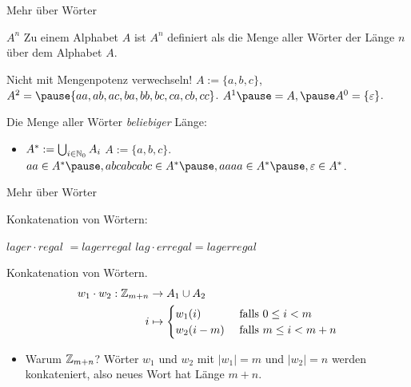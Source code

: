 \begin{frame}{Mehr über Wörter}

	\pause
	
	\begin{block}{$A^n$}
		Zu einem Alphabet $A$ \pause ist $A^n$ definiert als die Menge aller Wörter \pause der Länge $n$ \pause über dem Alphabet $A$.
	\end{block}

	\begin{itemize}
		\pitem Nicht mit Mengenpotenz verwechseln!
		\pitem $A := \{a, b, c\}$\pause , $A^2 = \pause \{aa, ab, ac, ba, bb, bc, ca, cb, cc\}$. \pause $A^1 \pause = A, \pause A^0 = \{\epsilon\}$.
	\end{itemize}
	
	\pause Die Menge aller Wörter \pause \emph{beliebiger} Länge: \pause
	\begin{itemize}
		\item $A^* := \bigcup_{i \in \mathbb{N}_0} A_i$
		\pitem $A := \{a, b, c\}$\pause . $aa \in A^*\pause , abcabcabc \in A^*\pause , aaaa \in A^*\pause , \epsilon \in A^*$.
	\end{itemize}
\end{frame}

\begin{frame}{Mehr über Wörter}
	
	\pause
	
	Konkatenation von Wörtern:
	
	\begin{itemize}
		\pitem $lager \cdot regal$ \pause $ = lagerregal$
		\pitem $lag \cdot erregal = lagerregal$
	\end{itemize}
	
	\pause
	
	\begin{block}{Konkatenation von Wörtern.}
		\begin{align*}
		w_1\cdot w_2 : \mathbb{Z}_{m+n} &\rightarrow A_1\cup A_2 \\
		i & \mapsto \begin{cases}
		w_1(i) & \text{ falls } 0\leq i<m \\
		w_2(i-m) & \text{ falls } m \leq i<m+n
		\end{cases}
		\end{align*}
	\end{block}

	\pause
	
	\begin{itemize}
		\item Warum $\mathbb{Z}_{m+n}$? \pause Wörter $w_1$ und $w_2$ \pause mit $|w_1| = m$ und $|w_2| = n$ werden konkateniert\pause , also neues Wort hat Länge $m + n$.
	\end{itemize}

\end{frame}

